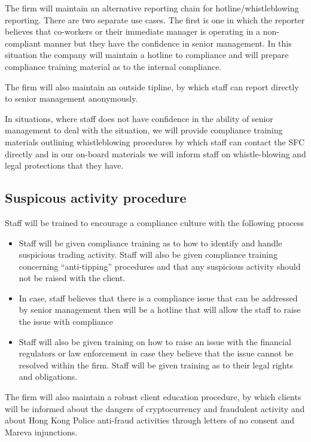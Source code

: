 The firm will maintain an alternative reporting chain for
hotline/whistleblowing reporting.  There are two separate use cases.
The first is one in which the reporter believes that co-workers or
their immediate manager is operating in a non-compliant manner but
they have the confidence in senior management.  In this situation the
company will maintain a hotline to compliance and will prepare
compliance training material as to the internal compliance.

The firm will also maintain an outside tipline, by which staff can
report directly to senior management anonymously.

In situations, where staff does not have confidence in the ability of
senior management to deal with the situation, we will provide
compliance training materials outlining whistleblowing procedures by
which staff can contact the SFC directly and in our on-board materials
we will inform staff on whistle-blowing and legal protections that
they have.

\subsection{Suspicous activity procedure}

Staff will be trained to encourage a compliance culture with the
following process
\begin{itemize}
  \item Staff will be given compliance training as to how to identify
    and handle suspicious trading activity.  Staff will also be given
    compliance training concerning ``anti-tipping'' procedures and
    that any suspicious activity should not be raised with the client.
  \item In case, staff believes that there is a compliance issue that
    can be addressed by senior management then will be a hotline that
    will allow the staff to raise the issue with compliance
  \item Staff will also be given training on how to raise an issue
    with the financial regulators or law enforcement in case they
    believe that the issue cannot be resolved within the firm.  Staff
    will be given training as to their legal rights and obligations.
\end{itemize}

The firm will also maintain a robust client education procedure, by
which clients will be informed about the dangers of cryptocurrency and
fraudulent activity and about Hong Kong Police anti-fraud activities
through letters of no consent and Mareva injunctions.

